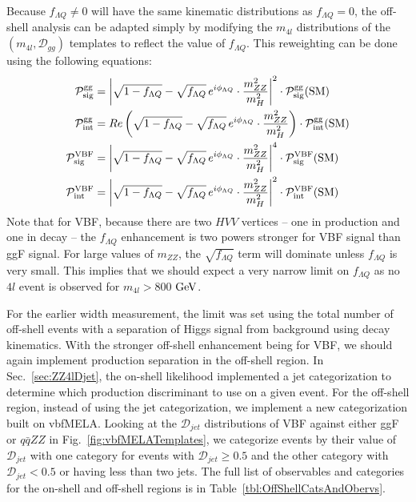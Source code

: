 Because $f_{\Lambda Q}\neq0$ will have the same kinematic distributions as $f_{\Lambda Q}=0$, the off-shell analysis can be adapted simply by modifying the $m_{4l}$ distributions of the $(m_{4l},\mathcal{D}_{gg})$ templates to reflect the value of $f_{\Lambda Q}$. This reweighting can be done using the following equations:
\begin{align}
{\mathcal P}_{\rm sig}^{\rm gg} &= \left|\sqrt{1-f_{\Lambda Q} } - \sqrt{f_{\Lambda Q}} \,e^{i\phi_{\Lambda Q}} \cdot \frac{m_{ZZ}^2}{m_{H}^2}\right|^2\cdot {\mathcal P}_{\rm sig}^{\rm gg}(\rm SM) \notag \\
{\mathcal P}_{\rm int}^{\rm gg} &= Re \left(\sqrt{1-f_{\Lambda Q} } - \sqrt{f_{\Lambda Q} } \,e^{i\phi_{\Lambda Q}} \cdot \frac{m_{ZZ}^2}{m_{H}^2}\right) \cdot {\mathcal P}_{\rm int}^{\rm gg}(\rm SM) \notag \\
{\mathcal P}_{\rm sig}^{\rm VBF} &= \left|\sqrt{1-f_{\Lambda Q} } - \sqrt{f_{\Lambda Q} } \,e^{i\phi_{\Lambda Q}} \cdot \frac{m_{ZZ}^2}{m_{H}^2}\right|^4\cdot {\mathcal P}_{\rm sig}^{\rm VBF}(\rm SM) \notag \\
{\mathcal P}_{\rm int}^{\rm VBF} &= \left|\sqrt{1-f_{\Lambda Q} } - \sqrt{f_{\Lambda Q} } \,e^{i\phi_{\Lambda Q}} \cdot \frac{m_{ZZ}^2}{m_{H}^2}\right|^2\cdot {\mathcal P}_{\rm int}^{\rm VBF}(\rm SM) \notag
\label{eqn:fLQOffShellFormula} 
\end{align}
Note that for VBF, because there are two $HVV$ vertices -- one in production and one in decay -- the $f_{\Lambda Q}$ enhancement is two powers stronger for VBF signal than ggF signal. For large values of $m_{ZZ}$, the $\sqrt{f_{\Lambda Q}}$ term will dominate unless $f_{\Lambda Q}$ is very small. This implies that we should expect a very narrow limit on $f_{\Lambda Q}$ as no $4l$ event is observed for $m_{4l} > 800$ $\rm{GeV}$.

For the earlier width measurement, the limit was set using the total number of off-shell events with a separation of Higgs signal from background using decay kinematics. With the stronger off-shell enhancement being for VBF, we should again implement production separation in the off-shell region. In Sec.~\ref{sec:ZZ4lDjet}, the on-shell likelihood implemented a jet categorization to determine which production discriminant to use on a given event. For the off-shell region, instead of using the jet categorization, we implement a new categorization built on vbfMELA. Looking at the $\mathcal{D}_{jet}$ distributions of VBF against either ggF or $q\bar{q}ZZ$ in Fig.~\ref{fig:vbfMELATemplates}, we categorize events by their value of $\mathcal{D}_{jet}$ with one category for events with $\mathcal{D}_{jet}\geq0.5$ and the other category with $\mathcal{D}_{jet}<0.5$ or having less than two jets. The full list of observables and categories for the on-shell and off-shell regions is in Table~\ref{tbl:OffShellCatsAndObervs}.

